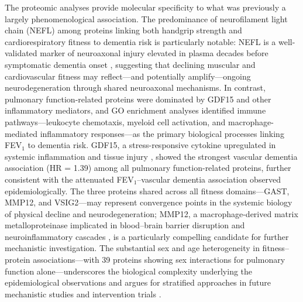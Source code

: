 \documentclass{article}
\begin{document}
The proteomic analyses provide molecular specificity to what was 
previously a largely phenomenological association.
The predominance of neurofilament light chain (NEFL) among proteins 
linking both handgrip strength and cardiorespiratory fitness to dementia 
risk is particularly notable: NEFL is a well-validated marker of 
neuroaxonal injury elevated in plasma decades before symptomatic dementia 
onset \citep{khalil2020nefl, zetterberg2019nefl}, suggesting that 
declining muscular and cardiovascular fitness may reflect—and potentially 
amplify—ongoing neurodegeneration through shared neuroaxonal mechanisms.
In contrast, pulmonary function-related proteins were dominated by GDF15 
and other inflammatory mediators, and GO enrichment analyses identified 
immune pathways—leukocyte chemotaxis, myeloid cell activation, and 
macrophage-mediated inflammatory responses—as the primary biological 
processes linking FEV$_1$ to dementia risk.
GDF15, a stress-responsive cytokine upregulated in systemic inflammation 
and tissue injury \citep{wiklund2010gdf15,breit2011tgf}, showed the 
strongest vascular dementia association (HR = 1.39) among all pulmonary 
function-related proteins, further consistent with the attenuated 
FEV$_1$--vascular dementia association observed epidemiologically.
The three proteins shared across all fitness domains—GAST, MMP12, and 
VSIG2—may represent convergence points in the systemic biology of 
physical decline and neurodegeneration; MMP12, a macrophage-derived 
matrix metalloproteinase implicated in blood--brain barrier disruption 
and neuroinflammatory cascades \citep{agrawal2006mmp12, 
yong2013mmp12brain}, is a particularly compelling candidate for further 
mechanistic investigation.
The substantial sex and age heterogeneity in fitness--protein 
associations—with 39 proteins showing sex interactions for pulmonary 
function alone—underscores the biological complexity underlying the 
epidemiological observations and argues for stratified approaches in 
future mechanistic studies and intervention trials \citep{nebel2018sex}.
\end{document}
